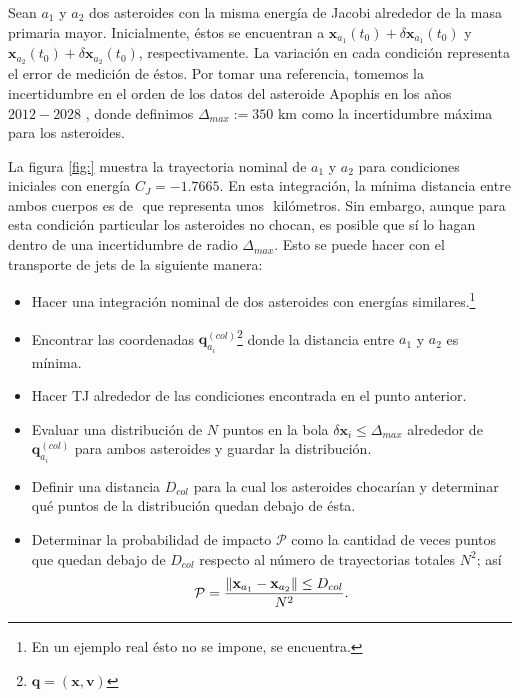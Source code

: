 
Sean $a_1$ y $a_2$ dos asteroides con la misma energía de Jacobi alrededor de la masa primaria mayor. Inicialmente, éstos se encuentran a $\mathbf{x}_{a_1}(t_0) + \delta\mathbf{x}_{a_1}(t_0)$  y $\mathbf{x}_{a_2}(t_0) + \delta\mathbf{x}_{a_2}(t_0)$, respectivamente. La variación en cada condición representa el error de medición de éstos. Por tomar una referencia, tomemos la incertidumbre en el orden de los datos del asteroide Apophis en los años $2012 - 2028$ \cite{Desmars2013}, donde definimos $\Delta_{max} := 350 $ km como la incertidumbre máxima para los asteroides.

La figura \ref{fig:} muestra la trayectoria nominal de $a_1$ y $a_2$ para condiciones iniciales con energía $C_J = -1.7665$. En esta integración, la mínima distancia entre ambos cuerpos es de $ $ que representa unos $ $ kilómetros. Sin embargo, aunque para esta condición particular los asteroides no chocan, es posible que sí lo hagan dentro de una incertidumbre de radio $\Delta_{max}$. Esto se puede hacer con el transporte de jets de la siguiente manera: 

\begin{itemize}
 \item Hacer una integración nominal de dos asteroides con energías similares.\footnote{En un ejemplo real ésto no se impone, se encuentra.}
 
 \item Encontrar las coordenadas $\mathbf{q}_{a_i}^{(col)}$\footnote{$\mathbf{q} = \left( \mathbf{x}, \mathbf{v} \right)$} donde la distancia entre $a_1$ y $a_2$ es mínima.
 
 \item Hacer TJ alrededor de las condiciones encontrada en el punto anterior.
 
 \item Evaluar una distribución de $N$ puntos en la bola $\delta\mathbf{x}_i \leq \Delta_{max}$ alrededor de $\mathbf{q}_{a_i}^{(col)}$ para ambos asteroides y guardar la distribución.
 
 \item Definir una distancia $D_{col}$ para la cual los asteroides chocarían y determinar qué puntos de la distribución quedan debajo de ésta.
 
 \item Determinar la probabilidad de impacto $\mathcal{P}$ como la cantidad de veces puntos que quedan debajo de $D_{col}$ respecto al número de trayectorias totales $N^2$; así
 \begin{equation} 
 \mathcal{P} = \frac{\left\lVert\mathbf{x}_{a_1} - \mathbf{x}_{a_2} \right\rVert    \leq D_{col} }{N^2}.
 \end{equation}
\end{itemize}

